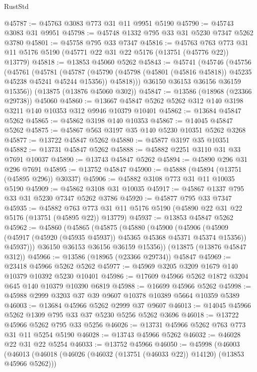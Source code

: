 \begin{lexlean}{RustStd}
\begin{coremodule}
@45787 := @45763 @3083 @773 @31 @11 @9951 @5190
@45790 := @45743 @3083 @31 @9951
@45798 := @45748 @1332 @795 @33 @31 @5230 @7347 @5262 @3780
@45801 := @45758 @795 @33 @7347
@45816 := @45763
    @763
    @773
    @31
    @11
    @5176
    @5190
    (@45771 @22 @31 @22 @5176 (@13751 (@45776 @22)) @13779)
@45818 := @13853 @45060 @5262
@45843 := @45741
    (@45746
      (@45756
        (@45761
          (@45781
            (@45787
              (@45790 (@45798 (@45801 (@45816 @45818)) @45235 @45238 @45241 @45244 @15356))
              @45818)))
        @36150
        @36153
        @36156
        @36159
        @15356))
    (@13875 (@13876 @45060 @302))
@45847 := @13586 (@18968 (@23366 @29738)) @45060
@45860 := @13667 @45847 @5262 @5262 @312 @140 @3198 @3211 @140 @10353 @312 @9946 @10379 @10401
@45862 := @13684 @45847 @5262
@45865 := @45862 @3198 @140 @10353
@45867 := @14045 @45847 @5262
@45875 := @45867 @563 @3197 @35 @140 @5230 @10351 @5262 @3268
@45877 := @13722 @45847 @5262
@45880 := @45877 @3197 @35 @10351
@45882 := @13731 @45847 @5262
@45888 := @45882 @2251 @3110 @31 @33 @7691 @10037
@45890 := @13743 @45847 @5262
@45894 := @45890 @296 @31 @296 @7691
@45895 := @13752 @45847
@45900 := @45888 (@45894 (@13751 (@45895 @296)) @30337)
@45906 := @45882 @3108 @773 @31 @11 @10035 @5190
@45909 := @45862 @3108 @31 @10035
@45917 := @45867 @1337 @795 @33 @31 @5230 @7347 @5262 @3786
@45920 := @45877 @795 @33 @7347
@45935 := @45882
    @763
    @773
    @31
    @11
    @5176
    @5190
    (@45890 @22 @31 @22 @5176 (@13751 (@45895 @22)) @13779)
@45937 := @13853 @45847 @5262
@45962 := @45860
    (@45865
      (@45875
        (@45880
          (@45900
            (@45906
              (@45909 (@45917 (@45920 (@45935 @45937)) @45365 @45368 @45371 @45374 @15356))
              @45937)))
        @36150
        @36153
        @36156
        @36159
        @15356))
    (@13875 (@13876 @45847 @312))
@45966 := @13586 (@18965 (@23366 @29734)) @45847
@45969 := @23418 @45966 @5262 @5262
@45977 := @45969 @3205 @3209 @1679 @140 @10379 @10392 @5230 @10401
@45986 := @17609 @45966 @5262 @1872 @3204 @645 @140 @10379 @10390 @6819
@45988 := @16699 @45966 @5262
@45998 := @45988 @2999 @3203 @37 @39 @9607 @10378 @10389 @5664 @10359 @5389
@46003 := @13684 @45966 @5262 @2999 @37 @9607
@46013 := @14045 @45966 @5262 @1309 @795 @33 @37 @5230 @5256 @5262 @3696
@46018 := @13722 @45966 @5262 @795 @33 @5256
@46026 := @13731 @45966 @5262 @763 @773 @31 @11 @5254 @5190
@46028 := @13743 @45966 @5262
@46032 := @46028 @22 @31 @22 @5254
@46033 := @13752 @45966
@46050 := @45998
    (@46003
      (@46013
        (@46018 (@46026 (@46032 (@13751 (@46033 @22)) @14120) (@13853 @45966 @5262)))

\end{coremodule}
\end{lexlean}
